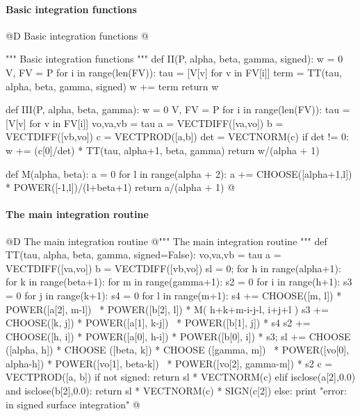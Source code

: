 \documentclass[11pt,oneside]{article}	%
\begin{document}
\paragraph{Basic integration functions}
@D Basic integration functions
@{""" Basic integration functions """
def II(P, alpha, beta, gamma, signed):
    w = 0
    V, FV = P
    for i in range(len(FV)):
        tau = [V[v] for v in FV[i]]
        term = TT(tau, alpha, beta, gamma, signed)
        w += term
    return w

def III(P, alpha, beta, gamma):
    w = 0
    V, FV = P
    for i in range(len(FV)):
        tau = [V[v] for v in FV[i]]
        vo,va,vb = tau
        a = VECTDIFF([va,vo])
        b = VECTDIFF([vb,vo])
        c = VECTPROD([a,b])
        det = VECTNORM(c)
        if det != 0: w += (c[0]/det) * TT(tau, alpha+1, beta, gamma)
    return w/(alpha + 1)

def M(alpha, beta):
    a = 0
    for l in range(alpha + 2):
        a += CHOOSE([alpha+1,l]) * POWER([-1,l])/(l+beta+1)
    return a/(alpha + 1)
@}



\paragraph{The main integration routine}
@D The main integration routine
@{""" The main integration routine """
def TT(tau, alpha, beta, gamma, signed=False):
	vo,va,vb = tau
	a = VECTDIFF([va,vo])
	b = VECTDIFF([vb,vo])
	sl = 0;
	for h in range(alpha+1):
		for k in range(beta+1):
			for m in range(gamma+1):
				s2 = 0
				for i in range(h+1): 
					s3 = 0
					for j in range(k+1):
						s4 = 0
						for l in range(m+1):
							s4 += CHOOSE([m, l]) * POWER([a[2], m-l]) \
								* POWER([b[2], l]) * M( h+k+m-i-j-l, i+j+l )
						s3 += CHOOSE([k, j]) * POWER([a[1], k-j]) \
							* POWER([b[1], j]) * s4
					s2 += CHOOSE([h, i]) * POWER([a[0], h-i]) * POWER([b[0], i]) * s3;
				sl += CHOOSE ([alpha, h]) * CHOOSE ([beta, k]) * CHOOSE ([gamma, m]) \
					* POWER([vo[0], alpha-h]) * POWER([vo[1], beta-k]) \
					* POWER([vo[2], gamma-m]) * s2
	c = VECTPROD([a, b])
	if not signed: return sl * VECTNORM(c)
	elif isclose(a[2],0.0) and isclose(b[2],0.0):
		return sl * VECTNORM(c) * SIGN(c[2])
	else: print "error: in signed surface integration"
@}
\end{document}
